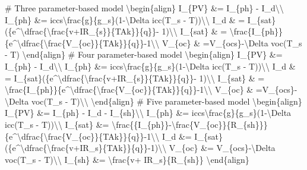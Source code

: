 \# Three parameter-based model
\textbackslash{}begin\{align\}
I\_\{PV\} \&= I\_\{ph\} - I\_d\textbackslash{}\textbackslash{}
I\_\{ph\} \&= iccs\textbackslash{}frac\{g\}\{g\_s\}(1-\textbackslash{}Delta icc(T\_s - T))\textbackslash{}\textbackslash{}
I\_d \& = I\_\{sat\}(\{e\^{}\textbackslash{}dfrac\{\textbackslash{}frac\{v+IR\_\{s\}\}\{TAk\}\}\{q\}\}- 1)\textbackslash{}\textbackslash{}
I\_\{sat\} \& = \textbackslash{}frac\{I\_\{ph\}\}\{e\^{}\textbackslash{}dfrac\{\textbackslash{}frac\{V\_\{oc\}\}\{TAk\}\}\{q\}\}-1\textbackslash{}\textbackslash{}
V\_\{oc\} \& =V\_\{ocs\}-\textbackslash{}Delta voc(T\_s - T)
\textbackslash{}end\{align\}
\# Four parameter-based model
\textbackslash{}begin\{align\}
I\_\{PV\} \&= I\_\{ph\} - I\_d\textbackslash{}\textbackslash{}
I\_\{ph\} \&= iccs\textbackslash{}frac\{g\}\{g\_s\}(1-\textbackslash{}Delta icc(T\_s - T))\textbackslash{}\textbackslash{}
I\_d \& = I\_\{sat\}(\{e\^{}\textbackslash{}dfrac\{\textbackslash{}frac\{v+IR\_\{s\}\}\{TAk\}\}\{q\}\}- 1)\textbackslash{}\textbackslash{}
I\_\{sat\} \& = \textbackslash{}frac\{I\_\{ph\}\}\{e\^{}\textbackslash{}dfrac\{\textbackslash{}frac\{V\_\{oc\}\}\{TAk\}\}\{q\}\}-1\textbackslash{}\textbackslash{}
V\_\{oc\} \& =V\_\{ocs\}-\textbackslash{}Delta voc(T\_s - T)\textbackslash{}\textbackslash{}
\textbackslash{}end\{align\}
\# Five parameter-based model
\textbackslash{}begin\{align\}
I\_\{PV\} \&= I\_\{ph\} - I\_d - I\_\{sh\}\textbackslash{}\textbackslash{}
I\_\{ph\} \&= iccs\textbackslash{}frac\{g\}\{g\_s\}(1-\textbackslash{}Delta icc(T\_s - T))\textbackslash{}\textbackslash{}
I\_\{sat\} \&= \textbackslash{}frac\{\{I\_\{ph\}\}-\textbackslash{}frac\{V\_\{oc\}\}\{R\_\{sh\}\}\}\{e\^{}\textbackslash{}dfrac\{\textbackslash{}frac\{V\_\{oc\}\}\{TAk\}\}\{q\}\}-1\textbackslash{}\textbackslash{}
I\_d \&= I\_\{sat\}(\{e\^{}\textbackslash{}dfrac\{\textbackslash{}frac\{v+IR\_s\}\{TAk\}\}\{q\}\}-1)\textbackslash{}\textbackslash{}
V\_\{oc\} \&= V\_\{ocs\}-\textbackslash{}Delta voc(T\_s - T)\textbackslash{}\textbackslash{}
I\_\{sh\} \&= \textbackslash{}frac\{v+ IR\_s\}\{R\_\{sh\}\}
\textbackslash{}end\{align\}